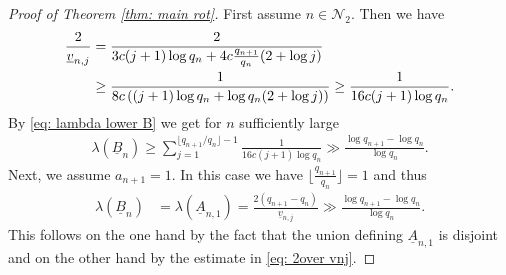 \documentclass[11pt]{amsart}
\theoremstyle{definition}
\numberwithin{equation}{section}
\begin{document}
\begin{proof}[Proof of Theorem \ref{thm: main rot}]
First assume $n\in\mathcal{N}_2$. Then we have 
\begin{align}
 \frac{2}{\underline{v}_{n,j}}
 &= \frac{2}{3c(j+1) \log q_n +  4c\frac{q_{n+1}}{q_n} (2+\log j)}\notag \\
 &\geq \frac{1}{8c\left( (j+1) \log q_n+  \log q_n (2+\log j)\right)}
 \geq \frac{1}{16c (j+1) \log q_n}.\label{eq: 2over vnj}
\end{align}
By \eqref{eq: lambda lower B} we get for $n$ sufficiently large
\begin{align}
 \lambda(\underline{B}_n)\geq \sum_{j=1}^{\lfloor q_{n+1}/q_n\rfloor-1}\frac{1}{16c (j+1) \log q_n}
 \gg \frac{ \log q_{n+1}-\log q_n}{\log q_n}.\label{eq: lower B N2} 
\end{align}
Next, we assume $a_{n+1}=1$. In this case we have $\lfloor \frac{q_{n+1}}{q_n}\rfloor=1$ and thus
\begin{align}
 \lambda(\underline{B}_n)
 &=\lambda\left(\underline{A}_{n,1}\right)
 = \frac{ 2(q_{n+1}-q_n)}{\underline{v}_{n,j}}
 \gg \frac{ \log q_{n+1}-\log q_n}{\log q_n}.
 \label{eq: lower B a1}
\end{align}
This follows on the one hand by the fact that the union defining $\underline{A}_{n,1}$ is disjoint and on the other hand by the estimate in \eqref{eq: 2over vnj}.


\end{proof}
\end{document}
